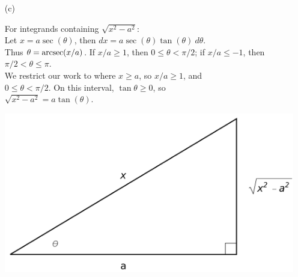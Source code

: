 \begin{enumerate}
	\item[(c)] \noindent
	\begin{minipage}[t]{.6\linewidth}
		For integrands containing $\sqrt{x^2-a^2}$:\\[5pt]
		Let $x=a\sec(\theta)$, then $dx = a\sec(\theta)\tan(\theta)\ d\theta$.\\[5pt]	
	Thus $\theta = \operatorname{arcsec}(x/a)$. If $x/a\geq 1$, then $0\leq\theta<\pi/2$; if $x/a \leq -1$, then $\pi/2<\theta\leq \pi$.\\[5pt]	
	We restrict our work to where $x\geq a$, so $x/a\geq 1$, and \\ $0\leq\theta<\pi/2$. On this interval, $\tan\theta\geq 0$, so \\
	$\sqrt{x^2-a^2} = a\tan(\theta).$
		\end{minipage}\qquad
	\begin{minipage}[t]{.4\linewidth}\vskip 0pt
		\includegraphics[width=.95\linewidth]{fig_int_13c}
		\end{minipage}	
\end{enumerate}

